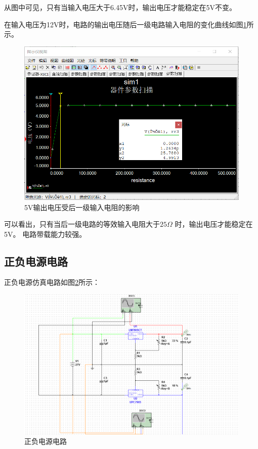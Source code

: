 \documentclass{article}
\begin{document}
\begin{spacing}{1.5}
    从图中可见，只有当输入电压大于6.45V时，输出电压才能稳定在5V不变。

    在输入电压为12V时，电路的输出电压随后一级电路输入电阻的变化曲线如图\ref{fig:sim1_result3}所示。
    \begin{figure}[H]
        \centering
        \includegraphics[scale=0.4]{fig/sim/sim1_result3.png}
        \caption{5V输出电压受后一级输入电阻的影响}
        \label{fig:sim1_result3}
    \end{figure}
    
    可以看出，只有当后一级电路的等效输入电阻大于$25 \Omega $ 时，输出电压才能稳定在5V。 
    电路带载能力较强。

    \subsection{正负电源电路}

    正负电源仿真电路如图\ref{fig:sim2}所示：
    \begin{figure}[H]
        \centering
        \includegraphics[scale=0.4]{fig/sim/sim2.png}
        \caption{正负电源电路}
        \label{fig:sim2}
    \end{figure}


\end{spacing}
\end{document}
